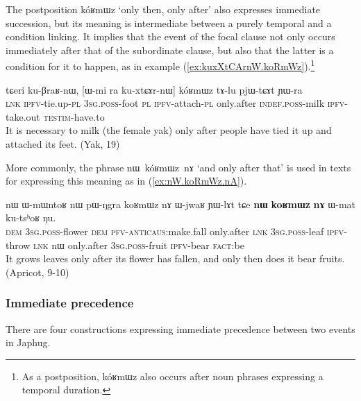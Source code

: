 \documentclass[oldfontcommands,oneside,a4paper,11pt]{article}
\newcommand{\ipa}[1]{{\phon \mbox{#1}}} %
\newcommand{\refb}[1]{(\ref{#1})}
\begin{document}
The postposition \ipa{kóʁmɯz} `only then, only after' also expresses immediate succession, but its meaning is intermediate between a purely temporal and a condition linking. It implies that the event of the focal clause not only occurs immediately after that of the subordinate clause, but also that the latter is a condition for it to happen, as  in example \refb{ex:kuxXtCArnW.koRmWz}.\footnote{As a postposition, \ipa{kóʁmɯz} also occurs after noun phrases expressing a temporal duration.}


\begin{exe}
\ex \label{ex:kuxXtCArnW.koRmWz}
\gll
\ipa{tɕeri}  	\ipa{ku-βraʁ-nɯ,}  	[\ipa{ɯ-mi}  	\ipa{ra}  	\ipa{ku-xtɕɤr-nɯ}]  	\ipa{kóʁmɯz}  	\ipa{tɤ-lu}  	\ipa{pjɯ-tɕɤt}  	\ipa{ɲɯ-ra}  \\
\textsc{lnk} \textsc{ipfv}-tie.up-\textsc{pl} \textsc{3sg.poss}-foot \textsc{pl} \textsc{ipfv}-attach-\textsc{pl} only.after \textsc{indef.poss}-milk \textsc{ipfv}-take.out  \textsc{testim}-have.to \\
\glt It is necessary to milk (the female yak) only after people have tied it up and attached its feet. (Yak, 19)
\end{exe}

More commonly, the phrase \ipa{nɯ kóʁmɯz nɤ} `and only after that' is used in texts for expressing this meaning as in \refb{ex:nW.koRmWz.nA}.
\begin{exe}
\ex \label{ex:nW.koRmWz.nA}
\gll
\ipa{nɯ}  	\ipa{ɯ-mɯntoʁ}  	\ipa{nɯ}  	\ipa{pɯ-ŋgra}  	\ipa{koʁmɯz}  	\ipa{nɤ}  	\ipa{ɯ-jwaʁ}  	\ipa{ɲɯ-lɤt}  	\ipa{tɕe}  	\ipa{\textbf{nɯ}}  	\ipa{\textbf{koʁmɯz}}  	\ipa{\textbf{nɤ}}  	\ipa{ɯ-mat}  	\ipa{ku-tsʰoʁ}  	\ipa{ŋu.}  	\\
\textsc{dem} \textsc{3sg.poss}-flower \textsc{dem} \textsc{pfv}-\textsc{anticaus}:make.fall only.after \textsc{lnk} \textsc{3sg.poss}-leaf \textsc{ipfv}-throw \textsc{lnk}  	\ipa{nɯ} only.after \textsc{3sg.poss}-fruit \textsc{ipfv}-bear \textsc{fact}:be \\
\glt It grows leaves only after its flower has fallen, and only then does it bear fruits. (Apricot, 9-10)
\end{exe}


\subsubsection{Immediate precedence}
There are four constructions expressing immediate precedence between two events in Japhug. 
\end{document}
